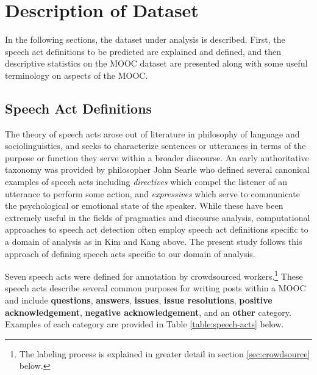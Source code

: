 \documentclass[twoside]{article}
\begin{document}
\section{Description of Dataset}\label{sec:data}
In the following sections, the dataset under analysis is described. First, the speech act definitions to be predicted are explained and defined, and then descriptive statistics on the MOOC dataset are presented along with some useful terminology on aspects of the MOOC.
\subsection{Speech Act Definitions}
The theory of speech acts arose out of literature in philosophy of language and sociolinguistics, and seeks to characterize sentences or utterances in terms of the purpose or function they serve within a broader discourse. An early authoritative taxonomy was provided by philosopher John Searle who defined several canonical examples of speech acts including \emph{directives} which compel the listener of an utterance to perform some action, and \emph{expressives} which serve to communicate the psychological or emotional state of the speaker. \cite{searle1976taxonomy} While these have been extremely useful in the fields of pragmatics and discourse analysis, computational approaches to speech act detection often employ speech act definitions specific to a domain of analysis as in Kim and Kang above. The present study follows this approach of defining speech acts specific to our domain of analysis.
\par
Seven speech acts were defined for annotation by crowdsourced workers.\footnote{The labeling process is explained in greater detail in section \ref{sec:crowdsource} below.} These speech acts describe several common purposes for writing posts within a MOOC and include \textbf{questions}, \textbf{answers}, \textbf{issues}, \textbf{issue resolutions}, \textbf{positive acknowledgement}, \textbf{negative acknowledgement}, and an \textbf{other} category. Examples of each category are provided in Table \ref{table:speech-acts} below. 
\par
\end{document}
